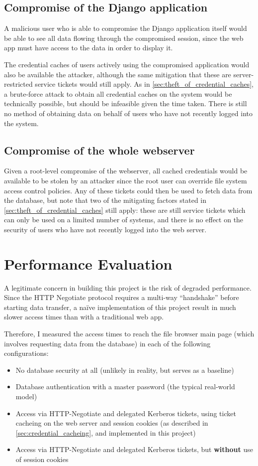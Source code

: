 \documentclass[12pt]{report}
\begin{document}
\subsection{Compromise of the Django application}
A malicious user who is able to compromise the Django application itself would be able to see all data flowing through the compromised session, since the web app must have access to the data in order to display it.

The credential caches of users actively using the compromised application would also be available the attacker, although the same mitigation that these are server-restricted service tickets would still apply. As in \autoref{sec:theft_of_credential_caches}, a brute-force attack to obtain all credential caches on the system would be technically possible, but should be infeasible given the time taken. There is still no method of obtaining data on behalf of users who have not recently logged into the system.

\subsection{Compromise of the whole webserver}
Given a root-level compromise of the webserver, all cached credentials would be available to be stolen by an attacker since the root user can override file system access control policies. Any of these tickets could then be used to fetch data from the database, but note that two of the mitigating factors stated in \autoref{sec:theft_of_credential_caches} still apply: these are still service tickets which can only be used on a limited number of systems, and there is no effect on the security of users who have not recently logged into the web server.

\section{Performance Evaluation}
\label{sec:performance_evaluation}
A legitimate concern in building this project is the risk of degraded performance. Since the HTTP Negotiate protocol requires a multi-way ``handshake'' before starting data transfer, a na\"ive implementation of this project result in much slower access times than with a traditional web app.

Therefore, I measured the access times to reach the file browser main page (which involves requesting data from the database) in each of the following configurations:
\begin{itemize}
\item
  No database security at all (unlikely in reality, but serves as a baseline)
\item
  Database authentication with a master password (the typical real-world model)
\item
  Access via HTTP-Negotiate and delegated Kerberos tickets, using ticket cacheing on the web server and session cookies (as described in \autoref{sec:credential_cacheing}, and implemented in this project)
\item
  Access via HTTP-Negotiate and delegated Kerberos tickets, but \textbf{without} use of session cookies
\end{itemize}
\end{document}
